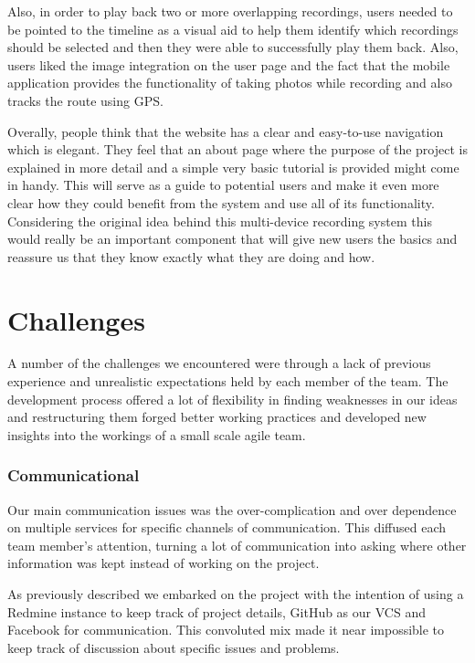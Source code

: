 \documentclass{l3proj}
\begin{document}
Also, in order to play back two or more overlapping recordings, users needed to be pointed to the timeline as a visual aid to help them identify which recordings should be selected and then they were able to successfully play them back. Also, users liked the image integration on the user page and the fact that the mobile application provides the functionality of taking photos while recording and also tracks the route using GPS.

Overally, people think that the website has a clear and easy-to-use navigation which is elegant. They feel that an about page where the purpose of the project is explained in more detail and a simple very basic tutorial is provided might come in handy. This will serve as a guide to potential users and make it even more clear how they could benefit from the system and use all of its functionality. Considering the original idea behind this multi-device recording system this would really be an important component that will give new users the basics and reassure us that they know exactly what they are doing and how.

\chapter{Challenges}
\label{Challenges}

A number of the challenges we encountered were through a lack of previous
experience and unrealistic expectations held by each member of the team. The
development process offered a lot of flexibility in finding weaknesses in our
ideas and restructuring them forged better working practices and developed new
insights into the workings of a small scale agile team.

\subsection{Communicational}
Our main communication issues was the over-complication and over dependence on multiple services for specific channels of communication. This diffused each team member's attention, turning a lot of communication into asking where other information was kept instead of working on the project.

As previously described we embarked on the project with the intention of using a Redmine instance to keep track of project details, GitHub as our VCS and Facebook for communication. This convoluted mix made it near impossible to keep track of discussion about specific issues and problems.
\end{document}
